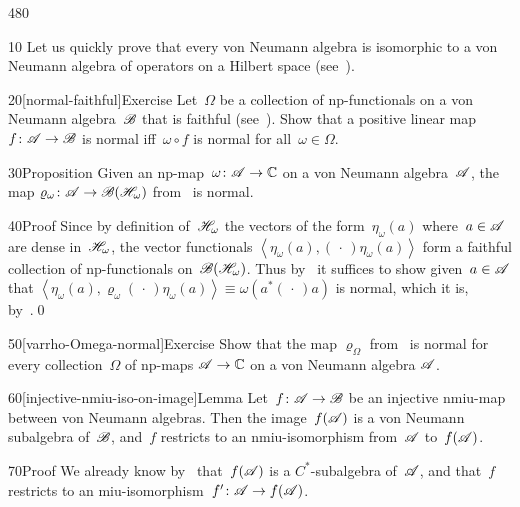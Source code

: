 \begin{parsec}{480}%
\begin{point}{10}%
Let us quickly prove that every von Neumann algebra
is isomorphic to a von Neumann algebra of operators on a 
Hilbert space (see~).
\end{point}
\begin{point}{20}[normal-faithful]{Exercise}%
Let~$\Omega$ be a collection of np-functionals
on a von Neumann algebra~$\mathscr{B}$
that is faithful (see~).
Show that a positive linear map $f\colon \mathscr{A}\to\mathscr{B}$
is normal iff~$\omega\circ f$
is normal for all~$\omega\in\Omega$.
\end{point}
\begin{point}{30}{Proposition}%
Given an np-map~$\omega\colon \mathscr{A} \to \mathbb{C}$
on a von Neumann algebra~$\mathscr{A}$,
the map $\varrho_\omega\colon \mathscr{A}\to\mathscr{B}(\mathscr{H}_\omega)$
from~ is normal.
\begin{point}{40}{Proof}%
Since by definition of~$\mathscr{H}_\omega$
the vectors of the form~$\eta_\omega(a)$
where~$a\in\mathscr{A}$
are dense in~$\mathscr{H}_\omega$,
the vector functionals
$\left<\eta_\omega(a),(\,\cdot\,)\eta_\omega(a)\right>$
form a faithful collection
of np-functionals on~$\mathscr{B}(\mathscr{H}_\omega)$.
Thus by~
it suffices to show given~$a\in\mathscr{A}$
that $\left<\eta_\omega(a),\varrho_\omega(\,\cdot\,)
\eta_\omega(a)\right>\equiv \omega(a^*(\,\cdot\,)a)$ is normal,
which it is, by~.\qed
\end{point}
\end{point}
\begin{point}{50}[varrho-Omega-normal]{Exercise}%
Show that the map $\varrho_\Omega$ 
from~
is normal for every collection~$\Omega$ of np-maps $\mathscr{A}\to\mathbb{C}$
on a von Neumann algebra $\mathscr{A}$.
\end{point}
\begin{point}{60}[injective-nmiu-iso-on-image]{Lemma}%
Let~$f\colon \mathscr{A}\to\mathscr{B}$ be an injective nmiu-map
between von Neumann algebras.
Then the image~$f(\mathscr{A})$ is a von Neumann subalgebra of~$\mathscr{B}$,
and~$f$ restricts to an nmiu-isomorphism from~$\mathscr{A}$
to~$f(\mathscr{A})$.
\begin{point}{70}{Proof}%
We already know by~
that~$f(\mathscr{A})$ is a $C^*$-subalgebra of~$\mathscr{A}$,
and that~$f$ restricts to an miu-isomorphism~$f'\colon \mathscr{A}\to f(\mathscr{A})$.

\end{point}
\end{point}
\end{parsec}
